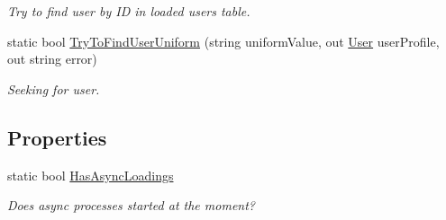 \begin{DoxyCompactItemize}
\begin{DoxyCompactList}\small\item\em Try to find user by ID in loaded users table. \end{DoxyCompactList}\item 
static bool \mbox{\hyperlink{class_authority_controller_1_1_a_p_i_1_1_local_users_a8bf53e0c8216de0a8f5244e11ccb90b5}{Try\+To\+Find\+User\+Uniform}} (string uniform\+Value, out \mbox{\hyperlink{class_authority_controller_1_1_data_1_1_personal_1_1_user}{User}} user\+Profile, out string error)
\begin{DoxyCompactList}\small\item\em Seeking for user. \end{DoxyCompactList}\end{DoxyCompactItemize}
\subsection*{Properties}
\begin{DoxyCompactItemize}
\item 
static bool \mbox{\hyperlink{class_authority_controller_1_1_a_p_i_1_1_local_users_afdfecc5fc12d8f2a862ddc030577a064}{Has\+Async\+Loadings}}
\begin{DoxyCompactList}\small\item\em Does async processes started at the moment? \end{DoxyCompactList}\end{DoxyCompactItemize}
